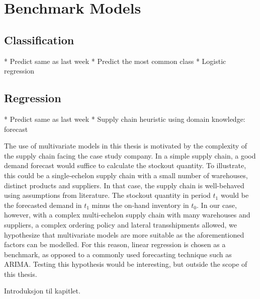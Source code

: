 \documentclass[../../main.tex]{subfiles}
\begin{document}

\section{Benchmark Models}

\subsection{Classification}
* Predict same as last week
* Predict the most common class
* Logistic regression

\subsection{Regression}
* Predict same as last week
* Supply chain heuristic using domain knowledge: forecast

The use of multivariate models in this thesis is motivated by the complexity of the supply chain facing the case study company. In a simple supply chain, a good demand forecast would suffice to calculate the stockout quantity. To illustrate, this could be a single-echelon supply chain with a small number of warehouses, distinct products and suppliers. In that case, the supply chain is well-behaved using assumptions from literature. The stockout quantity in period $t_1$ would be the forecasted demand in $t_1$ minus the on-hand inventory in $t_0$. In our case, however, with a complex multi-echelon supply chain with many warehouses and suppliers, a complex ordering policy and lateral transshipments allowed, we hypothesize that multivariate models are more suitable as the aforementioned factors can be modelled. For this reason, linear regression is chosen as a benchmark, as opposed to a commonly used forecasting technique such as ARIMA. Testing this hypothesis would be interesting, but outside the scope of this thesis.

Introduksjon til kapitlet.

\end{document}
